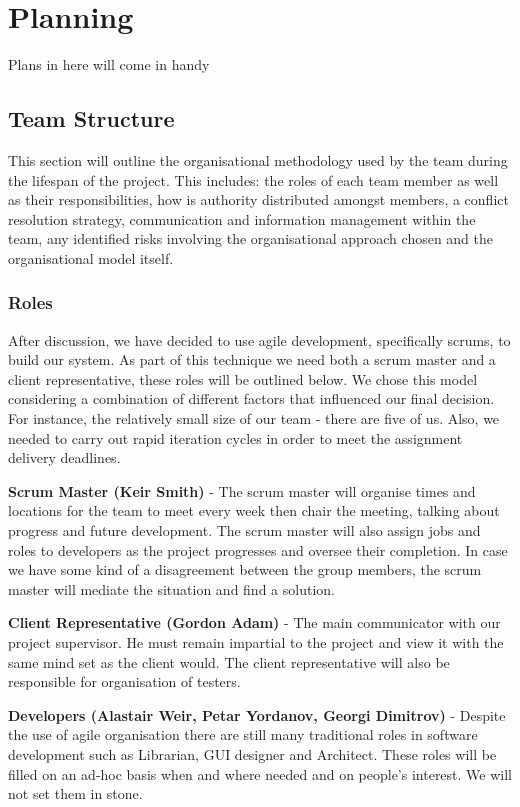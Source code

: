 \documentclass{l3proj}
\begin{document}
\chapter{Planning}
\label{Planning}

Plans in here will come in handy

\section{Team Structure}This section will outline the organisational methodology used by the team during the lifespan of the project. This includes: the roles of each team member as well as their responsibilities, how is authority distributed amongst members, a conflict resolution strategy, communication and information management within the team, any identified risks involving the organisational approach chosen and the organisational model itself.

\subsection{Roles}After discussion, we have decided to use agile development, specifically scrums, to build our system. As part of this technique we need both a scrum master and a client representative, these roles will be outlined below. We chose this model considering a combination of different factors that influenced our final decision. For instance, the relatively small size of our team - there are five of us. Also, we needed to carry out rapid iteration cycles in order to meet the assignment delivery deadlines.

{\bf Scrum Master (Keir Smith)} - The scrum master will organise times and locations for the team to meet every week then chair the meeting, talking about progress and future development. The scrum master will also assign jobs and roles to developers as the project progresses and oversee their completion. In case we have some kind of a disagreement between the group members, the scrum master will mediate the situation and find a solution.

{\bf Client Representative (Gordon Adam)} - The main communicator with our project supervisor. He must remain impartial to the project and view it with the same mind set as the client would. The client representative will also be responsible for organisation of testers.

{\bf Developers (Alastair Weir, Petar Yordanov, Georgi Dimitrov)} - Despite the use of agile organisation there are still many traditional roles in software development such as Librarian, GUI designer and Architect.  These roles will be filled on an ad-hoc basis when and where needed and on people’s interest. We will not set them in stone.
\end{document}
